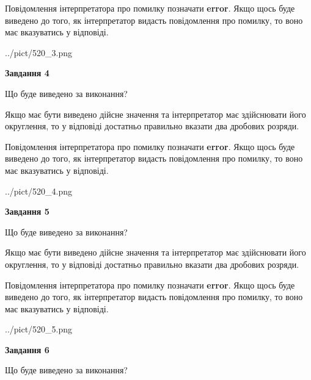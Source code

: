 \documentclass[12pt, ukrainian]{article}
\begin{document}
{\begin {Large}
Повідомлення інтерпретатора про помилку позначати \textbf{error}.
Якщо щось буде виведено до того, як інтерпретатор видасть повідомлення про помилку, 
то воно має вказуватись у відповіді. \par

\begin{center}
	{../pict/520_3.png}
\end{center}
\newpage

{\begin {center}\textbf{Завдання 4}\end {center}}\par
Що буде виведено за виконання? \par

Якщо має бути виведено дійсне значення та інтерпретатор має здійснювати його округлення, 
то у відповіді достатньо правильно вказати два дробових розряди.

Повідомлення інтерпретатора про помилку позначати \textbf{error}.
Якщо щось буде виведено до того, як інтерпретатор видасть повідомлення про помилку, 
то воно має вказуватись у відповіді. \par

\begin{center}
	{../pict/520_4.png}
\end{center}
\newpage

{\begin {center}\textbf{Завдання 5}\end {center}}\par
Що буде виведено за виконання? \par

Якщо має бути виведено дійсне значення та інтерпретатор має здійснювати його округлення, 
то у відповіді достатньо правильно вказати два дробових розряди.

Повідомлення інтерпретатора про помилку позначати \textbf{error}.
Якщо щось буде виведено до того, як інтерпретатор видасть повідомлення про помилку, 
то воно має вказуватись у відповіді. \par

\begin{center}
	{../pict/520_5.png}
\end{center}
\newpage

{\begin {center}\textbf{Завдання 6}\end {center}}\par
Що буде виведено за виконання? \par


\end{Large}}
\end{document}
